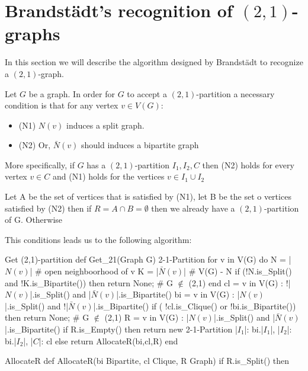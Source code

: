 \section{Brandstädt's recognition of $(2,1)$-graphs}

In this section we will describe the algorithm designed by Brandstädt to recognize a $(2,1)$-graph.

Let $G$ be a graph. In order for $G$ to accept a $(2,1)$-partition a necessary condition is that for any vertex $v \in V(G)$:

\begin{itemize}
\item (N1) $N(v)$ induces a split graph.
\item (N2) Or, $\bar{N}(v)$ should induces a bipartite graph
\end{itemize}

More specifically, if $G$ has a $(2,1)$-partition $I_1,I_2,C$ then (N2) holds for every vertex $v \in C$ and (N1) holds for the vertices $v \in I_1 \cup I_2$

Let A be the set of vertices that is satisfied by (N1), let B be the set o vertices satisfied by (N2) then if $R=A \cap B=\emptyset$ then we already have a $(2,1)$-partition of G. Otherwise 



This conditions leads us to the following algorithm:


\begin{code}{Get (2,1)-partition}
  def Get_21(Graph G) 2-1-Partition
    for v in V(G) do
      N = |$N(v)$| # open neighboorhood of v
      K = |$\bar{N}(v)$| # V(G) - N
      if (!N.is_Split() and !K.is_Bipartite()) then
        return None; # G $\notin$ (2,1)
    end
    cl = { v in V(G) : !|$N(v)$|.is_Split() and |$\bar{N}(v)$|.is_Bipartite() }
    bi = { v in V(G) : |$N(v)$|.is_Split() and !|$\bar{N}(v)$|.is_Bipartite() }
    if ( !cl.is_Clique() or !bi.is_Bipartite()) then
      return None; # G $\notin$ (2,1)
    R = {v in V(G) : |$N(v)$|.is_Split() and |$\bar{N}(v)$|.is_Bipartite()}
    if R.is_Empty() then
      return new 2-1-Partition {
        |$I_1$|: bi.|$I_1$|,
        |$I_2$|: bi.|$I_2$|,
        |$C$|: cl
      }
    else return AllocateR(bi,cl,R)
  end
\end{code}

\begin{code}{AllocateR}
  def AllocateR(bi Bipartite, cl Clique, R Graph)
    if R.is_Split() then
      

\end{code}

